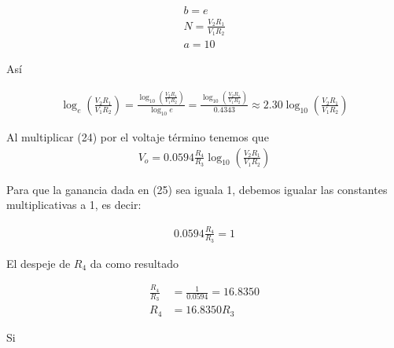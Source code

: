 \documentclass{article}
\begin{document}
\begin{align}
	b = e \nonumber \\
	N =  \frac{V_2R_1}{V_1R_2} \nonumber \\
	a = 10
\end{align}

\noindent Así

\begin{align}
	\log_e \left( \frac{V_2R_1}{V_1R_2} \right) = \frac{ \log_{10} \left( \frac{V_2R_1}{V_1R_2} \right) }{\log_{10} e} = \frac{ \log_{10} \left( \frac{V_2R_1}{V_1R_2} \right) }{0.4343} \approx 2.30 \log_{10} \left( \frac{V_2R_1}{V_1R_2} \right) 
\end{align}

\noindent Al multiplicar (24) por el voltaje término tenemos que
\begin{align}
	V_o = 0.0594 \frac{R_4}{R_3} \log_{10} \left( \frac{V_2R_1}{V_1R_2} \right) 
\end{align}

\noindent Para que la ganancia dada en (25) sea iguala 1, debemos igualar las constantes multiplicativas a 1, es decir:

\begin{align}
	0.0594 \frac{R_4}{R_3} = 1\nonumber
\end{align}

\noindent El despeje de $R_4$ da como resultado

\begin{align}
	\frac{R_4}{R_3} &= \frac{1}{0.0594} = 16.8350 \nonumber \\
	R_4 &= 16.8350R_3 \nonumber
\end{align}

\noindent Si 
\end{document}
